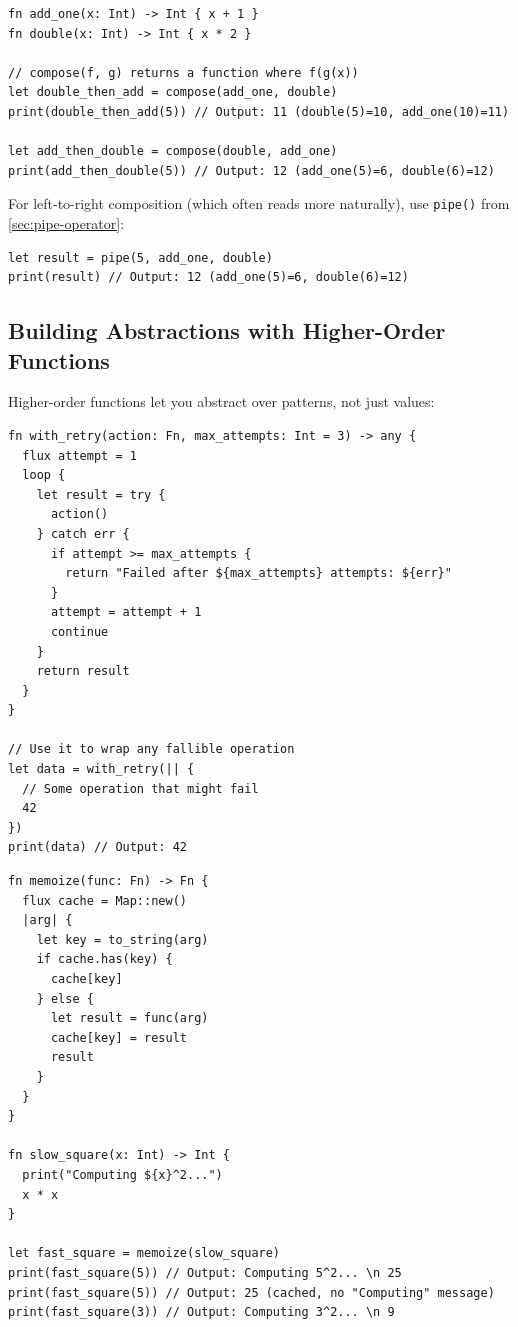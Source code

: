 \begin{lstlisting}[language=Lattice, caption={Composing functions}]
fn add_one(x: Int) -> Int { x + 1 }
fn double(x: Int) -> Int { x * 2 }

// compose(f, g) returns a function where f(g(x))
let double_then_add = compose(add_one, double)
print(double_then_add(5)) // Output: 11 (double(5)=10, add_one(10)=11)

let add_then_double = compose(double, add_one)
print(add_then_double(5)) // Output: 12 (add_one(5)=6, double(6)=12)
\end{lstlisting}

For left-to-right composition (which often reads more naturally), use \lstinline|pipe()| from \cref{sec:pipe-operator}:

\begin{lstlisting}[language=Lattice, caption={pipe for left-to-right composition}]
let result = pipe(5, add_one, double)
print(result) // Output: 12 (add_one(5)=6, double(6)=12)
\end{lstlisting}

\subsection{Building Abstractions with Higher-Order Functions}\label{sec:building-abstractions}

Higher-order functions let you abstract over patterns, not just values:

\begin{lstlisting}[language=Lattice, caption={Abstracting the retry pattern}]
fn with_retry(action: Fn, max_attempts: Int = 3) -> any {
  flux attempt = 1
  loop {
    let result = try {
      action()
    } catch err {
      if attempt >= max_attempts {
        return "Failed after ${max_attempts} attempts: ${err}"
      }
      attempt = attempt + 1
      continue
    }
    return result
  }
}

// Use it to wrap any fallible operation
let data = with_retry(|| {
  // Some operation that might fail
  42
})
print(data) // Output: 42
\end{lstlisting}

\begin{lstlisting}[language=Lattice, caption={A memoization wrapper}]
fn memoize(func: Fn) -> Fn {
  flux cache = Map::new()
  |arg| {
    let key = to_string(arg)
    if cache.has(key) {
      cache[key]
    } else {
      let result = func(arg)
      cache[key] = result
      result
    }
  }
}

fn slow_square(x: Int) -> Int {
  print("Computing ${x}^2...")
  x * x
}

let fast_square = memoize(slow_square)
print(fast_square(5)) // Output: Computing 5^2... \n 25
print(fast_square(5)) // Output: 25 (cached, no "Computing" message)
print(fast_square(3)) // Output: Computing 3^2... \n 9
\end{lstlisting}

